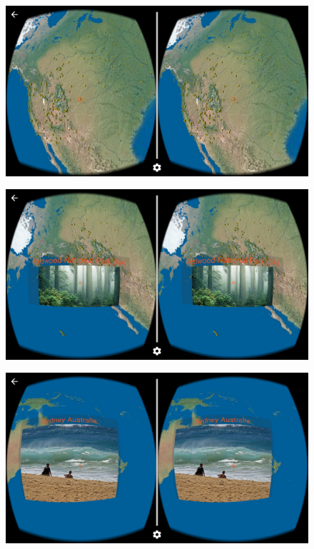 \begin{figure}[H]
	\centering
	\includegraphics[width=\linewidth, keepaspectratio]{Figures/Screenshots/device-2016-10-28-012642.png}
	\decoRule
\end{figure}

\begin{figure}[H]
	\centering
	\includegraphics[width=\linewidth, keepaspectratio]{Figures/Screenshots/device-2016-10-28-012721.png}
	\decoRule
\end{figure}

\begin{figure}[H]
	\centering
	\includegraphics[width=\linewidth, keepaspectratio]{Figures/Screenshots/device-2016-10-28-013208.png}
	\decoRule
\end{figure}

